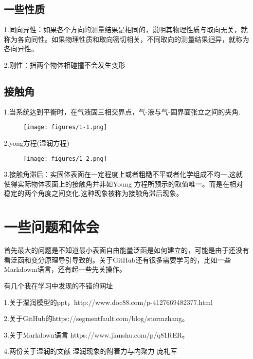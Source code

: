 \documentclass{article}
\begin{document}
		\subsection{一些性质}
		1.同向异性：如果各个方向的测量结果是相同的，说明其物理性质与取向无关，就称为各向同性。如果物理性质和取向密切相关，不同取向的测量结果迥异，就称为各向异性。
		
		2.刚性：指两个物体相碰撞不会发生变形
		
		\subsection{接触角}
		1.当系统达到平衡时，在气液固三相交界点，气-液与气-固界面张立之间的夹角.\\
		 
\begin{figure}[H]
\centering
\texttt{[image: figures/1-1.png]}
\caption{}
\end{figure}

       2.yong方程(湿润方程)\\
       
\begin{figure}[H]
	\centering
	\texttt{[image: figures/1-2.png]}
	\label{fig:2}
\end{figure}
        
        3.接触角滞后：实固体表面在一定程度上或者粗糙不平或者化学组成不均一,这就使得实际物体表面上的接触角并非如Young 方程所预示的取值唯一。而是在相对稳定的两个角度之间变化,这种现象被称为接触角滞后现象。
\section{一些问题和体会}\setlength{\parindent}{2em}
首先最大的问题是不知道最小表面自由能量泛函是如何建立的，可能是由于还没有看泛函和变分原理导引导致的。关于GitHub还有很多需要学习的，比如一些Markdowm语言，还有起一些先关操作。

有几个我在学习中发现的不错的网址

1.关于湿润模型的ppt，http://www.doc88.com/p-4127669482377.html

2.关于GitHub的https://segmentfault.com/blog/stormzhang。

3.关于Markdown语言 https://www.jianshu.com/p/q81RER。

4.两份关于湿润的文献  湿润现象的附着力与内聚力 庞礼军\\
\end{document}
